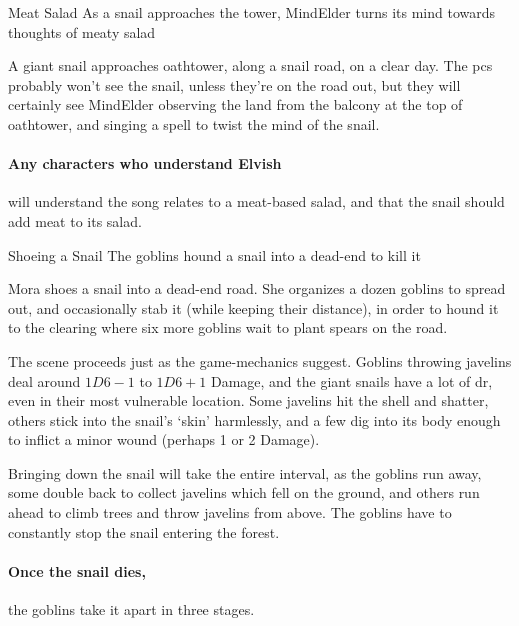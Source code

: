 
{Meat Salad}%
{As a snail approaches the tower, \gls{MindElder} turns its mind towards thoughts of meaty salad}%


A giant snail approaches \gls{oathtower}, along a snail road, on a clear day.
The \glspl{pc} probably won't see the snail, unless they're on the road out, but they will certainly see \gls{MindElder} observing the land from the balcony at the top of \gls{oathtower}, and singing a spell to twist the mind of the snail.

\paragraph{Any characters who understand Elvish}
will understand the song relates to a meat-based salad, and that the snail should add meat to its salad.

{Shoeing a Snail}%
{The goblins hound a snail into a dead-end to kill it}%

Mora shoes a snail into a dead-end road.
She organizes a dozen goblins to spread out, and occasionally stab it (while keeping their distance), in order to hound it to the clearing where six more goblins wait to plant spears on the road.

The scene proceeds just as the game-mechanics suggest.
Goblins throwing javelins deal around $1D6-1$ to $1D6+1$ Damage, and the giant snails have a lot of \gls{dr}, even in their most vulnerable location.
Some javelins hit the shell and shatter, others stick into the snail's `skin' harmlessly, and a few dig into its body enough to inflict a minor wound (perhaps 1 or 2 Damage).

Bringing down the snail will take the entire \gls{interval}, as the goblins run away, some double back to collect javelins which fell on the ground, and others run ahead to climb trees and throw javelins from above.
The goblins have to constantly stop the snail entering the forest.

\paragraph{Once the snail dies,}
the goblins take it apart in three stages.

